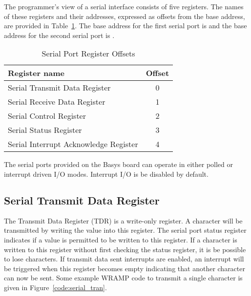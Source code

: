 The programmer's view of a serial interface consists of five registers.
The names of these registers and their addresses, expressed as offsets
from the base address, are provided in
Table~\ref{table:serial_offsets}. The base address for the first
serial port is \src{\LOCFSPBASE} and the base address for the
second serial port is \src{\LOCSSPBASE}.

\begin{table}[h]
\begin{center}
\begin{tabular}{|l|c|}
\hline
\textbf{Register name} & \textbf{Offset} \\
\hline
Serial Transmit Data Register & 0 \\
\hline
Serial Receive Data Register & 1 \\
\hline
Serial Control Register & 2 \\
\hline
Serial Status Register & 3 \\
\hline
Serial Interrupt Acknowledge Register & 4 \\
\hline
\end{tabular}
\caption{Serial Port Register Offsets}
\label{table:serial_offsets}
\end{center}
\end{table}

The serial ports provided on the Basys board can operate in either
polled or interrupt driven I/O modes. Interrupt I/O is be disabled
by default.

\subsection{Serial Transmit Data Register}

The Transmit Data Register (TDR) is a write-only register. A character
will be transmitted by writing the value into this register. The
serial port status register indicates if a value is permitted to be
written to this register. If a character is written to this register
without first checking the status register, it is be possible to lose
characters. If transmit data sent interrupts are enabled, an interrupt
will be triggered when this register becomes empty indicating that
another character can now be sent. Some example WRAMP code to transmit
a single character is given in Figure~\ref{code:serial_tran}.


